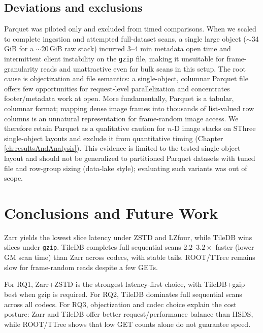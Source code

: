 \documentclass[nomenclature, english, bibtex]{kththesis}
\numberwithin{listing}{chapter}
\begin{document}
\section{Deviations and exclusions}
Parquet was piloted only and excluded from timed comparisons. When we scaled to complete ingestion and attempted full-dataset scans, a single large object (\(\sim\)34\,GiB for a \(\sim\)20\,GiB raw stack) incurred 3–4 min metadata open time and intermittent client instability on the \texttt{gzip} file, making it unsuitable for frame-granularity reads and unattractive even for bulk scans in this setup. The root cause is objectization and file semantics: a single-object, columnar Parquet file offers few opportunities for request-level parallelization and concentrates footer/metadata work at open. More fundamentally, Parquet is a tabular, columnar format; mapping dense image frames into thousands of list-valued row columns is an unnatural representation for frame-random image access. We therefore retain Parquet as a qualitative caution for $n$-D image stacks on \gls{SThree} single-object layouts and exclude it from quantitative timing (Chapter \ref{ch:resultsAndAnalysis}). This evidence is limited to the tested single-object layout and should not be generalized to partitioned Parquet datasets with tuned file and row-group sizing (data-lake style); evaluating such variants was out of scope.


















\cleardoublepage
\chapter{Conclusions and Future Work}
\label{ch:conclusionsAndFutureWork}
Zarr yields the lowest slice latency under \gls{ZSTD} and \gls{LZfour}, while TileDB wins slices under \texttt{gzip}. TileDB completes full sequential scans $2.2$--$3.2\times$ faster (lower \gls{GM} scan time) than Zarr across codecs, with stable tails. \gls{ROOT}/\gls{TTree} remains slow for frame‑random reads despite a few GETs.

For RQ1, Zarr+\gls{ZSTD} is the strongest latency-first choice, with TileDB+gzip best when gzip is required. For RQ2, TileDB dominates full sequential scans across all codecs. For RQ3, objectization and codec choice explain the cost posture: Zarr and TileDB offer better request/performance balance than \gls{HSDS}, while \gls{ROOT}/\gls{TTree} shows that low GET counts alone do not guarantee speed.
\end{document}
